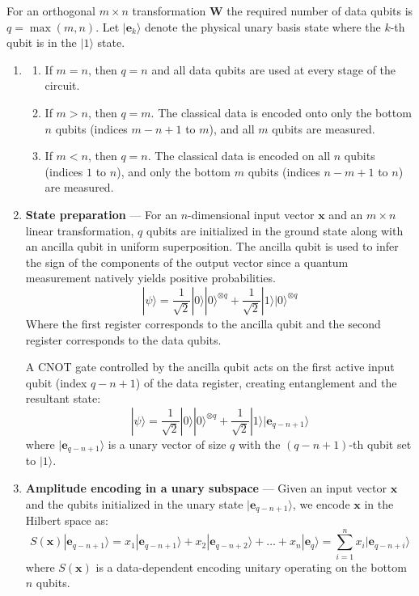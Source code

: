 \documentclass{iopjournal}
\begin{document}
For an orthogonal $m \times n$ transformation $\mathbf{W}$ the required number of data qubits is $q = \max(m, n)$. Let $|\mathbf{e}_k\rangle$ denote the physical unary basis state where the $k$-th qubit is in the $|1\rangle$ state.
\begin{enumerate}

    \item \begin{enumerate}
        \item If $m = n$, then $q = n$ and all data qubits are used at every stage of the circuit.
        \item If $m > n$, then $q = m$. The classical data is encoded onto only the bottom $n$ qubits (indices $m - n + 1$ to $m$), and all $m$ qubits are measured.
        \item If $m < n$, then $q = n$. The classical data is encoded on all $n$ qubits (indices $1$ to $n$), and only the bottom $m$ qubits (indices $n - m + 1$ to $n$) are measured.
    \end{enumerate}

    \item \textbf{State preparation} — For an $n$-dimensional input vector $\mathbf{x}$ and an $m \times n$ linear transformation, $q$ qubits are initialized in the ground state along with an ancilla qubit in uniform superposition. The ancilla qubit is used to infer the sign of the components of the output vector since a quantum measurement natively yields positive probabilities. 
    \[|\psi\rangle = \dfrac{1}{\sqrt{2}}|0\rangle|0\rangle^{\otimes q} + \dfrac{1}{\sqrt{2}}|1\rangle|0\rangle^{\otimes q}\]
    Where the first register corresponds to the ancilla qubit and the second register corresponds to the data qubits.

    A CNOT gate controlled by the ancilla qubit acts on the first active input qubit (index $q - n + 1$) of the data register, creating entanglement and the resultant state:
    \[|\psi\rangle = \dfrac{1}{\sqrt{2}}|0\rangle|0\rangle^{\otimes q} + \dfrac{1}{\sqrt{2}}|1\rangle|\mathbf{e}_{q-n+1}\rangle\]
    where $|\mathbf{e}_{q-n+1}\rangle$ is a unary vector of size $q$ with the $(q - n + 1)$-th qubit set to $|1\rangle$.
    
    \item \textbf{Amplitude encoding in a unary subspace} — Given an input vector $\mathbf{x}$ and the qubits initialized in the unary state $|\mathbf{e}_{q-n+1}\rangle$, we encode $\mathbf{x}$ in the Hilbert space as:
    \[S(\mathbf{x})|\mathbf{e}_{q-n+1}\rangle = x_1 |\mathbf{e}_{q-n+1}\rangle + x_2 |\mathbf{e}_{q-n+2}\rangle + \dots + x_n |\mathbf{e}_{q}\rangle = \sum_{i=1}^n x_i|\mathbf{e}_{q-n+i}\rangle\]
    where $S(\mathbf{x})$ is a data-dependent encoding unitary operating on the bottom $n$ qubits.


\end{enumerate}
\end{document}
